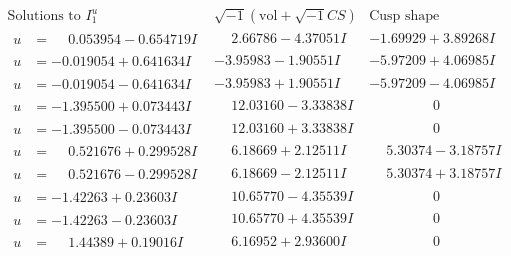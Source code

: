 \documentclass[1p]{elsarticle_modified}
\theoremstyle{definition}
\newcommand{\I}{\sqrt{-1}}
\begin{document}
$$\begin{array}{c|c|c}
\text{Solutions to }I^u_{1}& \I (\text{vol} + \sqrt{-1}CS) & \text{Cusp shape}\\
 \hline 
\begin{aligned}
u &= \phantom{-}0.053954 - 0.654719 I\end{aligned}
 & \phantom{-}2.66786 - 4.37051 I & -1.69929 + 3.89268 I \\ \hline\begin{aligned}
u &= -0.019054 + 0.641634 I\end{aligned}
 & -3.95983 - 1.90551 I & -5.97209 + 4.06985 I \\ \hline\begin{aligned}
u &= -0.019054 - 0.641634 I\end{aligned}
 & -3.95983 + 1.90551 I & -5.97209 - 4.06985 I \\ \hline\begin{aligned}
u &= -1.395500 + 0.073443 I\end{aligned}
 & \phantom{-}12.03160 - 3.33838 I & \phantom{-0.000000 } 0 \\ \hline\begin{aligned}
u &= -1.395500 - 0.073443 I\end{aligned}
 & \phantom{-}12.03160 + 3.33838 I & \phantom{-0.000000 } 0 \\ \hline\begin{aligned}
u &= \phantom{-}0.521676 + 0.299528 I\end{aligned}
 & \phantom{-}6.18669 + 2.12511 I & \phantom{-}5.30374 - 3.18757 I \\ \hline\begin{aligned}
u &= \phantom{-}0.521676 - 0.299528 I\end{aligned}
 & \phantom{-}6.18669 - 2.12511 I & \phantom{-}5.30374 + 3.18757 I \\ \hline\begin{aligned}
u &= -1.42263 + 0.23603 I\end{aligned}
 & \phantom{-}10.65770 - 4.35539 I & \phantom{-0.000000 } 0 \\ \hline\begin{aligned}
u &= -1.42263 - 0.23603 I\end{aligned}
 & \phantom{-}10.65770 + 4.35539 I & \phantom{-0.000000 } 0 \\ \hline\begin{aligned}
u &= \phantom{-}1.44389 + 0.19016 I\end{aligned}
 & \phantom{-}6.16952 + 2.93600 I & \phantom{-0.000000 } 0 \\ \hline\begin{aligned}

\end{aligned}
\end{array}$$
\end{document}
